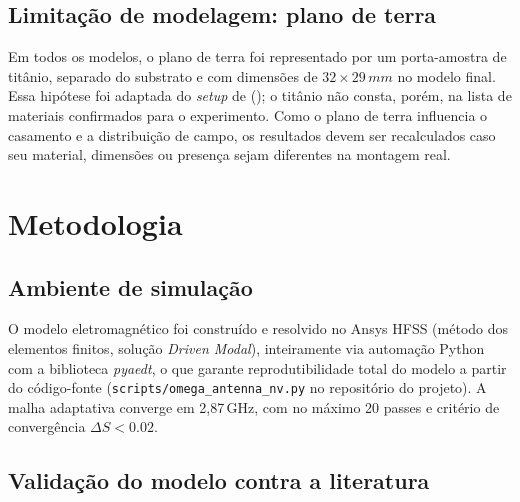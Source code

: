 \documentclass[10pt,a4paper,twocolumn]{article}
\newcommand{\citeonline}[1]{\citeauthor{#1} (\citeyear{#1})}
\begin{document}
\subsection*{Limita\c{c}\~ao de modelagem: plano de terra}

Em todos os modelos, o plano de terra foi representado por um
porta-amostra de tit\^anio, separado do substrato e com dimens\~oes de
$32\times29\,mm$ no modelo final. Essa hip\'otese foi adaptada do
\emph{setup} de \citeonline{opaluch2021}; o tit\^anio n\~ao consta,
por\'em, na lista de materiais confirmados para o experimento. Como o
plano de terra influencia o casamento e a distribui\c{c}\~ao de campo,
os resultados devem ser recalculados caso seu material, dimens\~oes ou
presen\c{c}a sejam diferentes na montagem real.

\section{Metodologia}
\label{sec:metodologia}

\subsection{Ambiente de simula\c{c}\~ao}

O modelo eletromagn\'etico foi constru\'ido e resolvido no Ansys HFSS
(m\'etodo dos elementos finitos, solu\c{c}\~ao \emph{Driven Modal}),
inteiramente via automa\c{c}\~ao Python com a biblioteca
\emph{pyaedt}, o que garante reprodutibilidade total do modelo a
partir do c\'odigo-fonte (\texttt{scripts/omega\_antenna\_nv.py} no
reposit\'orio do projeto). A malha adaptativa converge em
2,87\,GHz, com no m\'aximo 20 passes e crit\'erio de
converg\^encia $\Delta S < 0.02$.

\subsection{Valida\c{c}\~ao do modelo contra a literatura}
\end{document}
